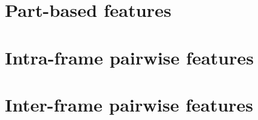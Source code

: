 \chapter{Part-based features}

\chapter{Intra-frame pairwise features}

\chapter{Inter-frame pairwise features}
